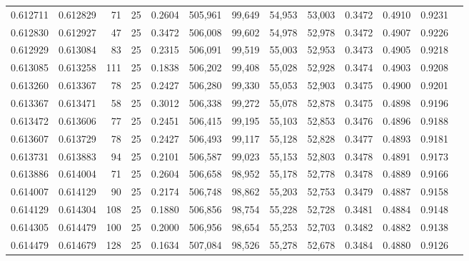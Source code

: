 \begin{tabular}{rrrrrrrrrrrrr}
0.612711 & 0.612829 &    71 &  25 &                                     0.2604 & 505,961 &  99,649 &  54,953 &  53,003 & 0.3472 & 0.4910 & 0.9231 \\
0.612830 & 0.612927 &    47 &  25 &                                     0.3472 & 506,008 &  99,602 &  54,978 &  52,978 & 0.3472 & 0.4907 & 0.9226 \\
0.612929 & 0.613084 &    83 &  25 &                                     0.2315 & 506,091 &  99,519 &  55,003 &  52,953 & 0.3473 & 0.4905 & 0.9218 \\
0.613085 & 0.613258 &   111 &  25 &                                     0.1838 & 506,202 &  99,408 &  55,028 &  52,928 & 0.3474 & 0.4903 & 0.9208 \\
0.613260 & 0.613367 &    78 &  25 &                                     0.2427 & 506,280 &  99,330 &  55,053 &  52,903 & 0.3475 & 0.4900 & 0.9201 \\
0.613367 & 0.613471 &    58 &  25 &                                     0.3012 & 506,338 &  99,272 &  55,078 &  52,878 & 0.3475 & 0.4898 & 0.9196 \\
0.613472 & 0.613606 &    77 &  25 &                                     0.2451 & 506,415 &  99,195 &  55,103 &  52,853 & 0.3476 & 0.4896 & 0.9188 \\
0.613607 & 0.613729 &    78 &  25 &                                     0.2427 & 506,493 &  99,117 &  55,128 &  52,828 & 0.3477 & 0.4893 & 0.9181 \\
0.613731 & 0.613883 &    94 &  25 &                                     0.2101 & 506,587 &  99,023 &  55,153 &  52,803 & 0.3478 & 0.4891 & 0.9173 \\
0.613886 & 0.614004 &    71 &  25 &                                     0.2604 & 506,658 &  98,952 &  55,178 &  52,778 & 0.3478 & 0.4889 & 0.9166 \\
0.614007 & 0.614129 &    90 &  25 &                                     0.2174 & 506,748 &  98,862 &  55,203 &  52,753 & 0.3479 & 0.4887 & 0.9158 \\
0.614129 & 0.614304 &   108 &  25 &                                     0.1880 & 506,856 &  98,754 &  55,228 &  52,728 & 0.3481 & 0.4884 & 0.9148 \\
0.614305 & 0.614479 &   100 &  25 &                                     0.2000 & 506,956 &  98,654 &  55,253 &  52,703 & 0.3482 & 0.4882 & 0.9138 \\
0.614479 & 0.614679 &   128 &  25 &                                     0.1634 & 507,084 &  98,526 &  55,278 &  52,678 & 0.3484 & 0.4880 & 0.9126 \\

\end{tabular}
